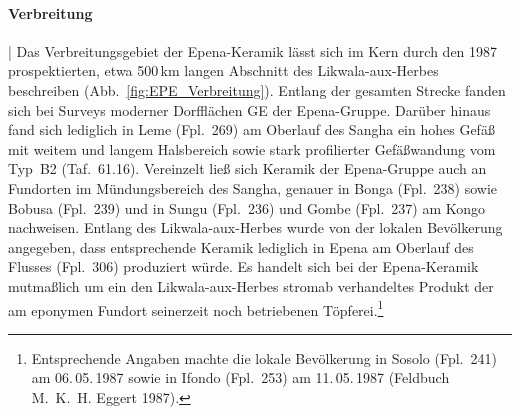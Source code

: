 \paragraph{Verbreitung}\hspace{-.5em}|\hspace{.5em}%
Das Verbreitungsgebiet der Epena-Keramik lässt sich im Kern durch den 1987 prospektierten, etwa 500\,km langen Abschnitt des \mbox{Likwala}-\mbox{aux}-\mbox{Herbes} beschreiben (Abb.~\ref*{fig:EPE_Verbreitung}). Entlang der gesamten Strecke fanden sich bei Surveys moderner Dorfflächen GE der Epena-Gruppe. Darüber hinaus fand sich lediglich in Leme (Fpl.~269) am Oberlauf des \mbox{Sangha} ein hohes Gefäß mit weitem und langem Halsbereich sowie stark profilierter Gefäßwandung vom Typ~B2 (Taf.~61.16). Vereinzelt ließ sich Keramik der Epena-Gruppe auch an Fundorten im Mündungsbereich des \mbox{Sangha}, genauer in Bonga (Fpl.~238) sowie Bobusa (Fpl.~239) und in Sungu (Fpl.~236) und Gombe (Fpl.~237) am Kongo nachweisen. Entlang des \mbox{Likwala}-\mbox{aux}-\mbox{Herbes} wurde von der lokalen Bevölkerung angegeben, dass entsprechende Keramik lediglich in Epena am Oberlauf des Flusses (Fpl.~306) produziert würde. Es handelt sich bei der Epena-Keramik mutmaßlich um ein den \mbox{Likwala}-\mbox{aux}-\mbox{Herbes} stromab verhandeltes Produkt der am eponymen Fundort seinerzeit noch betriebenen Töpferei.\footnote{Entsprechende Angaben machte die lokale Bevölkerung in Sosolo (Fpl.~241) am 06.\,05.\,1987 sowie in Ifondo (Fpl.~253) am 11.\,05.\,1987 (Feldbuch M.~K.~H. Eggert 1987).}